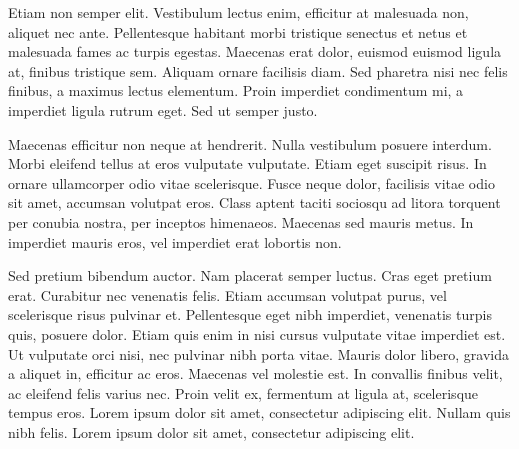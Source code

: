 \documentclass[11pt,oneside,openright]{book}
\begin{document}
Etiam non semper elit. Vestibulum lectus enim, efficitur at malesuada non, aliquet nec ante. Pellentesque habitant morbi tristique senectus et netus et malesuada fames ac turpis egestas. Maecenas erat dolor, euismod euismod ligula at, finibus tristique sem. Aliquam ornare facilisis diam. Sed pharetra nisi nec felis finibus, a maximus lectus elementum. Proin imperdiet condimentum mi, a imperdiet ligula rutrum eget. Sed ut semper justo.

Maecenas efficitur non neque at hendrerit. Nulla vestibulum posuere interdum. Morbi eleifend tellus at eros vulputate vulputate. Etiam eget suscipit risus. In ornare ullamcorper odio vitae scelerisque. Fusce neque dolor, facilisis vitae odio sit amet, accumsan volutpat eros. Class aptent taciti sociosqu ad litora torquent per conubia nostra, per inceptos himenaeos. Maecenas sed mauris metus. In imperdiet mauris eros, vel imperdiet erat lobortis non.

Sed pretium bibendum auctor. Nam placerat semper luctus. Cras eget pretium erat. Curabitur nec venenatis felis. Etiam accumsan volutpat purus, vel scelerisque risus pulvinar et. Pellentesque eget nibh imperdiet, venenatis turpis quis, posuere dolor. Etiam quis enim in nisi cursus vulputate vitae imperdiet est. Ut vulputate orci nisi, nec pulvinar nibh porta vitae. Mauris dolor libero, gravida a aliquet in, efficitur ac eros. Maecenas vel molestie est. In convallis finibus velit, ac eleifend felis varius nec. Proin velit ex, fermentum at ligula at, scelerisque tempus eros. Lorem ipsum dolor sit amet, consectetur adipiscing elit. Nullam quis nibh felis. Lorem ipsum dolor sit amet, consectetur adipiscing elit.
\end{document}
